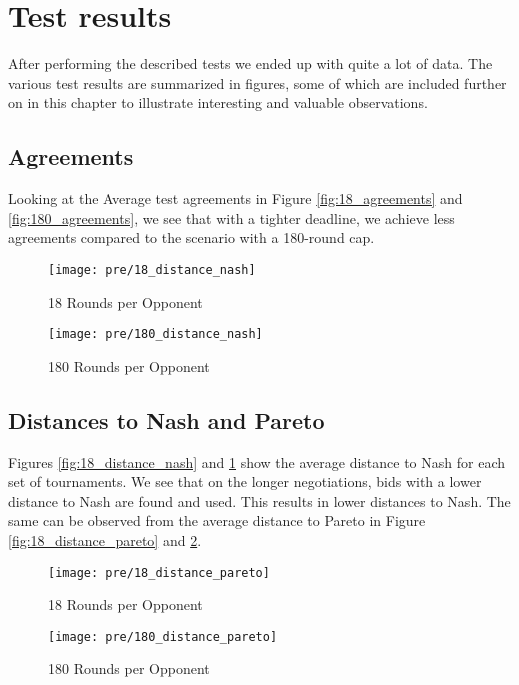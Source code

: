 \section{Test results}

After performing the described tests we ended up with quite a lot of data. The various test results are summarized in figures, some of which are included further on in this chapter to illustrate interesting and valuable observations.

\subsection{Agreements}

Looking at the Average test agreements in Figure \ref{fig:18_agreements} and \ref{fig:180_agreements}, we see that with a tighter deadline, we achieve less agreements compared to the scenario with a 180-round cap.

\begin{figure}[!htb]
	\texttt{[image: pre/18\_distance\_nash]}
	\caption{18 Rounds per Opponent}
	\label{fig:18_distance_nash}
	\endminipage\hfill
	\texttt{[image: pre/180\_distance\_nash]}
	\caption{180 Rounds per Opponent}
	\label{fig:180_distance_nash}
	\endminipage\hfill
\end{figure}

\subsection{Distances to Nash and Pareto}

Figures \ref{fig:18_distance_nash} and \ref{fig:180_distance_nash} show the average distance to Nash for each set of tournaments. We see that on the longer negotiations, bids with a lower distance to Nash are found and used. This results in lower distances to Nash. The same can be observed from the average distance to Pareto in Figure \ref{fig:18_distance_pareto} and \ref{fig:180_distance_pareto}.

\begin{figure}[!htb]
	\texttt{[image: pre/18\_distance\_pareto]}
	\caption{18 Rounds per Opponent}
	\label{fig:18_distance_pareto}
	\endminipage\hfill
	\texttt{[image: pre/180\_distance\_pareto]}
	\caption{180 Rounds per Opponent}
	\label{fig:180_distance_pareto}
	\endminipage\hfill
\end{figure}

